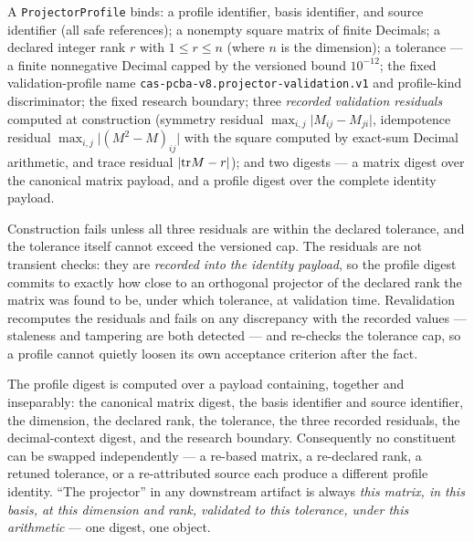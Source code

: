 \begin{definition}\label{ch06:def:projector}
A \texttt{ProjectorProfile} binds: a profile identifier, basis
identifier, and source identifier (all safe references); a nonempty
square matrix of finite Decimals; a declared integer rank $r$ with
$1 \le r \le n$ (where $n$ is the dimension); a tolerance --- a finite
nonnegative Decimal capped by the versioned bound
$10^{-12}$; the fixed validation-profile name
\texttt{cas-pcba-v8.projector-validation.v1} and profile-kind
discriminator; the fixed research boundary; three \emph{recorded
validation residuals} computed at construction (symmetry residual
$\max_{i,j} \lvert M_{ij} - M_{ji} \rvert$, idempotence residual
$\max_{i,j} \lvert (M^2 - M)_{ij} \rvert$ with the square computed by
exact-sum Decimal arithmetic, and trace residual
$\lvert \mathrm{tr} M - r \rvert$); and two digests --- a matrix digest over
the canonical matrix payload, and a profile digest over the complete
identity payload.
\end{definition}

\begin{ruleenv}
\label{ch06:rule:tolerance}
Construction fails unless all three residuals are within the declared
tolerance, and the tolerance itself cannot exceed the versioned cap.
The residuals are not transient checks: they are \emph{recorded into
the identity payload}, so the profile digest commits to exactly how
close to an orthogonal projector of the declared rank the matrix was
found to be, under which tolerance, at validation time. Revalidation
recomputes the residuals and fails on any discrepancy with the recorded
values --- staleness and tampering are both detected --- and re-checks
the tolerance cap, so a profile cannot quietly loosen its own
acceptance criterion after the fact.
\end{ruleenv}

\begin{ruleenv}
\label{ch06:rule:onedigest}
The profile digest is computed over a payload containing, together and
inseparably: the canonical matrix digest, the basis identifier and
source identifier, the dimension, the declared rank, the tolerance, the
three recorded residuals, the decimal-context digest, and the research
boundary. Consequently no constituent can be swapped independently ---
a re-based matrix, a re-declared rank, a retuned tolerance, or a
re-attributed source each produce a different profile identity. ``The
projector'' in any downstream artifact is always \emph{this matrix, in
this basis, at this dimension and rank, validated to this tolerance,
under this arithmetic} --- one digest, one object.
\end{ruleenv}

